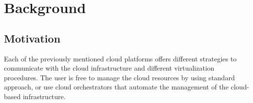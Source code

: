 \documentclass[3p,times]{elsarticle}
\begin{document}



\section{Background}

\subsection{Motivation}

Each of the previously mentioned cloud platforms offers different strategies to communicate with the cloud infrastructure and different virtualization procedures. The user is free to manage the cloud resources by using standard approach, or use cloud orchestrators that automate the management of the cloud-based infrastructure. 
\end{document}
